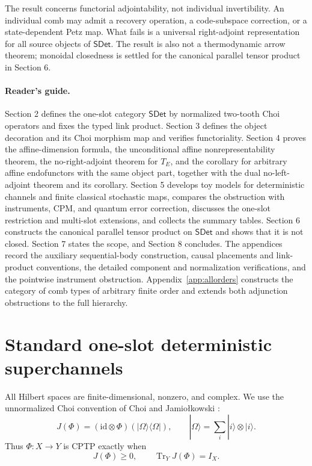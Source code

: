 \documentclass[11pt,a4paper]{article}
\theoremstyle{definition}
\theoremstyle{plain}
\theoremstyle{remark}
\DeclareMathOperator{\Tr}{Tr}
\newcommand{\id}{\mathrm{id}}
\newcommand{\SDet}{\mathsf{SDet}}
\begin{document}
The result concerns functorial adjointability, not individual invertibility. An individual comb may admit a recovery operation, a code-subspace correction, or a state-dependent Petz map. What fails is a universal right-adjoint representation for all source objects of $\SDet$. The result is also not a thermodynamic arrow theorem; monoidal closedness is settled for the canonical parallel tensor product in Section 6.

\paragraph{Reader's guide.} Section 2 defines the one-slot category $\SDet$ by normalized two-tooth Choi operators and fixes the typed link product. Section 3 defines the object decoration and its Choi morphism map and verifies functoriality. Section 4 proves the affine-dimension formula, the unconditional affine
nonrepresentability theorem, the no-right-adjoint theorem for $T_E$, and
the corollary for arbitrary affine endofunctors with the same object part,
together with the dual no-left-adjoint theorem and its corollary.
Section 5 develops toy models for deterministic channels and finite classical stochastic maps, compares the obstruction with instruments, CPM, and quantum error correction, discusses the one-slot restriction and multi-slot extensions, and collects the summary tables. Section 6 constructs the canonical parallel tensor product on $\SDet$ and shows that it is not closed. Section 7 states the scope, and Section 8 concludes. The appendices record the auxiliary sequential-body construction, causal placements and link-product conventions, the detailed component and normalization verifications, and the pointwise instrument obstruction. Appendix~\ref{app:allorders} constructs the category of comb types of arbitrary finite order and extends both adjunction obstructions to the full hierarchy.

\section{Standard one-slot deterministic superchannels}

All Hilbert spaces are finite-dimensional, nonzero, and complex. We use the
unnormalized Choi convention of Choi and Jamio\l{}kowski
\cite{choi1975,jamiolkowski1972}:
\[
J(\Phi)=(\id\otimes\Phi)(|\Omega\rangle\langle\Omega|),
\qquad |\Omega\rangle=\sum_i|i\rangle\otimes|i\rangle.
\]
Thus $\Phi:X\to Y$ is CPTP exactly when
\[
J(\Phi)\ge0,
\qquad \Tr_YJ(\Phi)=I_X.
\]
\end{document}

